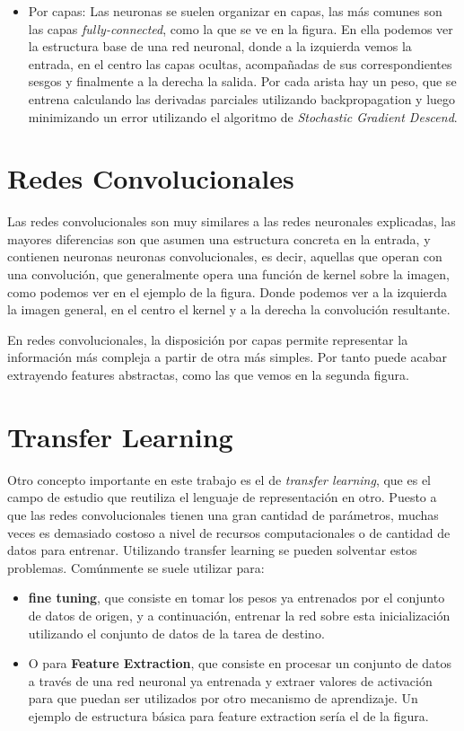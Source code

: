 \documentclass[a4paper,9pt]{extarticle}
\begin{document}
\begin{multicols*}{2}
\begin{itemize}
\item {\color{blue} Por capas}: Las neuronas se suelen organizar en capas, las más comunes son las capas \textit{fully-connected}, como la que se ve en la figura. 
En ella podemos ver la estructura base de una red neuronal, donde a la izquierda vemos la entrada, en el centro las capas ocultas, acompañadas de sus correspondientes sesgos y finalmente a la derecha la salida. Por cada arista hay un peso, que se entrena calculando las derivadas parciales utilizando backpropagation y luego minimizando un error utilizando el algoritmo de \textit{Stochastic Gradient Descend}. 

\end{itemize}

\section{Redes Convolucionales}
Las redes convolucionales son muy similares a las redes neuronales explicadas, las mayores diferencias son 
que asumen una estructura concreta en la entrada, y contienen neuronas neuronas convolucionales, es decir, aquellas que operan con 
una convolución, que generalmente opera una función de kernel sobre la imagen, como podemos 
ver en el ejemplo de la figura.  Donde podemos ver a la izquierda la imagen general, en el centro el kernel y a la derecha la convolución resultante. 

En redes convolucionales, la disposición por capas permite representar la información más compleja a
partir de otra más simples. Por tanto puede acabar extrayendo features abstractas, como las que vemos en la segunda figura. 

\section{Transfer Learning}

Otro concepto importante en este trabajo es el de \textit{transfer learning}, que es el campo
de estudio que reutiliza el lenguaje de representación en otro. Puesto a que las redes convolucionales 
tienen una gran cantidad de parámetros, muchas veces es demasiado costoso a nivel de recursos computacionales
o de cantidad de datos para entrenar. Utilizando transfer learning se pueden solventar estos problemas. 
Comúnmente se suele utilizar para:
\begin{itemize}
\item \textbf{fine tuning}, que consiste en tomar los pesos ya entrenados por el conjunto de datos de origen, y a continuación, entrenar la red sobre esta inicialización utilizando el conjunto de datos de la tarea de destino. 
\item O para \textbf{Feature Extraction}, que consiste en procesar un conjunto de datos a través de una red neuronal
ya entrenada y extraer valores de activación para que puedan ser utilizados por otro mecanismo de
aprendizaje. Un ejemplo de estructura básica para feature extraction sería el de la figura.
\end{itemize}


\end{multicols*}
\end{document}
